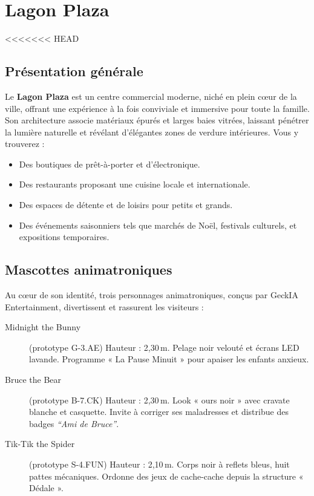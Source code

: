 \section{Lagon Plaza} %
<<<<<<< HEAD

\subsection{Présentation générale}
Le \textbf{Lagon Plaza} est un centre commercial moderne, niché en plein cœur de la ville, offrant une expérience à la fois conviviale et immersive pour toute la famille. Son architecture associe matériaux épurés et larges baies vitrées, laissant pénétrer la lumière naturelle et révélant d’élégantes zones de verdure intérieures. Vous y trouverez :
\begin{itemize}
  \item Des boutiques de prêt-à-porter et d’électronique.
  \item Des restaurants proposant une cuisine locale et internationale.
  \item Des espaces de détente et de loisirs pour petits et grands.
  \item Des événements saisonniers tels que marchés de Noël, festivals culturels, et expositions temporaires.
\end{itemize}

\subsection{Mascottes animatroniques}
Au cœur de son identité, trois personnages animatroniques, conçus par GeckIA Entertainment, divertissent et rassurent les visiteurs :
\begin{description}
  \item[Midnight the Bunny] (prototype G-3.AE)
    Hauteur : 2,30\,m. Pelage noir velouté et écrans LED lavande. Programme « La Pause Minuit » pour apaiser les enfants anxieux.
  \item[Bruce the Bear] (prototype B-7.CK)  
    Hauteur : 2,30\,m. Look « ours noir » avec cravate blanche et casquette. Invite à corriger ses maladresses et distribue des badges \emph{“Ami de Bruce”}.
  \item[Tik-Tik the Spider] (prototype S-4.FUN)  
    Hauteur : 2,10\,m. Corps noir à reflets bleus, huit pattes mécaniques. Ordonne des jeux de cache-cache depuis la structure « Dédale ».
\end{description}

